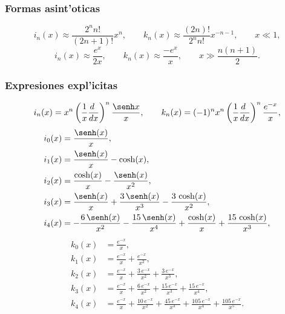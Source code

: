 \subsubsection{Formas asint'oticas}
\begin{equation}
i_n(x)\approx\frac{2^nn!}{(2n+1)!}x^n, \qquad k_n(x)\approx\frac{(2n)!}{2^nn!}x^{-n-1}, \qquad x\ll 1,
\end{equation}
\begin{equation}
i_n(x)\approx \frac{e^x}{2x}, \qquad k_n(x)\approx \frac{-e^x}{x}, \qquad x\gg \frac{n(n+1)}{2}.
\end{equation}


\subsubsection{Expresiones expl'icitas}
\begin{equation}
i_n(x)=x^n\left(\frac{1}{x}\frac{d\ }{dx}\right)^n\frac{\senh x}{x}, \qquad 
k_n(x)=(-1)^nx^n\left(\frac{1}{x}\frac{d\ }{dx}\right)^n\frac{e^{-x}}{x},
\end{equation}
\begin{align}
i_0(x) &= \frac{\senh (x)}{x}, \\
i_1(x) &= \frac{\senh (x)}{x}-\cosh (x), \\
i_2(x) &=\frac{\cosh (x)}{x}-\frac{\senh (x) }{{x}^{2}}, \\
i_3(x) &= \frac{\senh (x)}{x}+\frac{3\,\senh (x) }{{x}^{3}}-\frac{3\,\cosh (x) }{{x}^{2}}, \\
i_4(x) &= -\frac{6\,\senh (x) }{{x}^{2}}-\frac{15\,\senh (x) }{{x}^{4}}+\frac{\cosh (x) }{x}+\frac{15\,\cosh (x) }{{x}^{3}},
\end{align}
\begin{align}
k_0(x) &= \frac{{e}^{-x}}{x} , \\
k_1(x) &= \frac{{e}^{-x}}{x}+\frac{{e}^{-x}}{{x}^{2}}, \\
k_2(x) &= \frac{{e}^{-x}}{x}+\frac{3\,{e}^{-x}}{{x}^{2}}+\frac{3\,{e}^{-x}}{{x}^{3}}, \\
k_3(x) &= \frac{{e}^{-x}}{x}+\frac{6\,{e}^{-x}}{{x}^{2}}+\frac{15\,{e}^{-x}}{{x}^{3}}+\frac{15\,{e}^{-x}}{{x}^{4}}, \\
k_4(x) &= \frac{{e}^{-x}}{x}+\frac{10\,{e}^{-x}}{{x}^{2}}+\frac{45\,{e}^{-x}}{{x}^{3}}+\frac{105\,{e}^{-x}}{{x}^{4}}+\frac{105\,{e}^{-x}}{{x}^{5}}.
\end{align}
